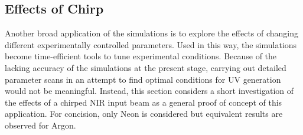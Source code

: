 \documentclass[a4paper]{jpconf}
\begin{document}
\subsection{Effects of Chirp}
Another broad application of the simulations is to explore the effects of changing different experimentally controlled parameters. Used in this way, the simulations become time-efficient tools to tune experimental conditions. Because of the lacking accuracy of the simulations at the present stage, carrying out detailed parameter scans in an attempt to find optimal conditions for UV generation would not be meaningful. Instead, this section considers a short investigation of the effects of a chirped NIR input beam as a general proof of concept of this application. For concision, only Neon is considered but equivalent results are observed for Argon. \par 
\end{document}
